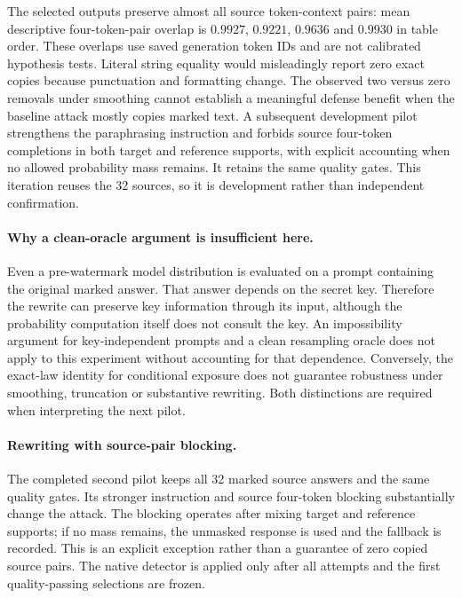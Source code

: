 The selected outputs preserve almost all source token-context pairs: mean descriptive four-token-pair overlap is $0.9927$, $0.9221$, $0.9636$ and $0.9930$ in table order. These overlaps use saved generation token IDs and are not calibrated hypothesis tests. Literal string equality would misleadingly report zero exact copies because punctuation and formatting change. The observed two versus zero removals under smoothing cannot establish a meaningful defense benefit when the baseline attack mostly copies marked text. A subsequent development pilot strengthens the paraphrasing instruction and forbids source four-token completions in both target and reference supports, with explicit accounting when no allowed probability mass remains. It retains the same quality gates. This iteration reuses the 32 sources, so it is development rather than independent confirmation.

\paragraph{Why a clean-oracle argument is insufficient here.} Even a pre-watermark model distribution is evaluated on a prompt containing the original marked answer. That answer depends on the secret key. Therefore the rewrite can preserve key information through its input, although the probability computation itself does not consult the key. An impossibility argument for key-independent prompts and a clean resampling oracle does not apply to this experiment without accounting for that dependence. Conversely, the exact-law identity for conditional exposure does not guarantee robustness under smoothing, truncation or substantive rewriting. Both distinctions are required when interpreting the next pilot.

\paragraph{Rewriting with source-pair blocking.}
The completed second pilot keeps all 32 marked source answers and the same quality gates. Its stronger instruction and source four-token blocking substantially change the attack. The blocking operates after mixing target and reference supports; if no mass remains, the unmasked response is used and the fallback is recorded. This is an explicit exception rather than a guarantee of zero copied source pairs. The native detector is applied only after all attempts and the first quality-passing selections are frozen.



